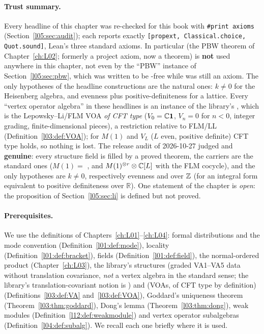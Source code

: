 \paragraph{Trust summary.} Every headline of this chapter was re-checked for this book with
\texttt{\#print axioms} (Section~\ref{l05:sec:audit}); each reports exactly
\texttt{[propext, Classical.choice, Quot.sound]}, Lean's three standard axioms. In particular
 (the PBW theorem of Chapter~\ref{ch:L02}; formerly a project axiom, now a theorem) is
\textbf{not} used anywhere in this chapter, not even by the ``PBW'' instance of Section~\ref{l05:sec:pbw}, which was
written to be -free while  was still an axiom. The only hypotheses of the headline constructions are the natural ones: $k\neq0$ for
the Heisenberg algebra, and evenness plus positive-definiteness for a lattice. Every ``vertex operator algebra'' in
these headlines is an instance of the library's , which is the Lepowsky--Li/FLM VOA
\emph{of CFT type} ($V_0 = {\mathbb{C}}\mathbf{1}$, $V_n = 0$ for $n<0$, integer grading, finite-dimensional pieces), a restriction
relative to FLM/LL (Definition~\ref{l03:def:VOA}); for $M(1)$ and $V_L$ ($L$ even, positive definite) CFT type holds, so
nothing is lost. The release audit of 2026-10-27 judged  and 
\textbf{genuine}: every structure field is filled by a proved theorem, the carriers are the standard ones
($M(1) = $ , and $M(1)^{\otimes r}\otimes{\mathbb{C}}[L]$ with the FLM cocycle), and the only hypotheses
are $k\neq0$, respectively evenness and  over ${\mathbb{Z}}$ (for an integral form equivalent to positive
definiteness over $\mathbb{R}$). One statement of the
chapter is \emph{open}: the proposition  of Section~\ref{l05:sec:li} is defined but
not proved.

\paragraph{Prerequisites.} We use the definitions of Chapters~\ref{ch:L01}--\ref{ch:L04}: formal distributions and
the mode convention  (Definition~\ref{l01:def:mode}), locality
(Definition~\ref{l01:def:bracket}), fields (Definition~\ref{l01:def:field}), the normal-ordered product
 (Chapter~\ref{ch:L03}), the library's structures  (graded VA1--VA5 data without
translation covariance, \emph{not} a vertex algebra in the standard sense; the library's translation-covariant notion
is ) and  (VOAs, of CFT type by definition) (Definitions~\ref{l03:def:VA} and~\ref{l03:def:VOA}), Goddard's uniqueness theorem
(Theorem~\ref{l03:thm:goddard}), Dong's lemma (Theorem~\ref{l03:thm:dong}), weak modules
(Definition~\ref{l12:def:weakmodule}) and vertex operator subalgebras
(Definition~\ref{l04:def:subalg}). We recall each one briefly where it is used.


